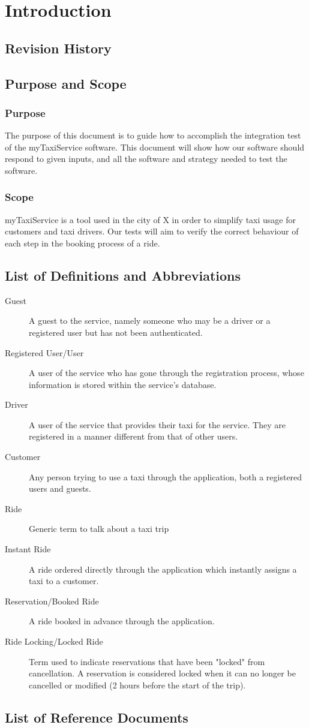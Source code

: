 \section{Introduction}
  \subsection{Revision History}
  \subsection{Purpose and Scope}
    \subsubsection{Purpose}
      The purpose of this document is to guide how to accomplish the integration test of the myTaxiService software.
      This document will show how our software should respond to given inputs, and all the software and strategy needed to test the software.
    \subsubsection{Scope}
      myTaxiService is a tool used in the city of X in order to simplify taxi usage for customers and taxi drivers. Our tests will aim to verify the correct behaviour of 
	  each step in the booking process of a ride.
  \subsection{List of Definitions and Abbreviations}
    \begin{description}
    	\item[Guest]
    		A guest to the service, namely someone who may be a driver or a registered user but has not been authenticated.
    	\item[Registered User/User]
    		A user of the service who has gone through the registration process, whose information is stored within the service's database.
    	\item[Driver]
    		A user of the service that provides their taxi for the service. They are registered in a manner different from that of other users.
    	\item[Customer]
    		Any person trying to use a taxi through the application, both a registered users and guests.
    	\item[Ride]
    		Generic term to talk about a taxi trip
    	\item[Instant Ride]
    		A ride ordered directly through the application which instantly assigns a taxi to a customer.
    	\item[Reservation/Booked Ride]
    		A ride booked in advance through the application.
    	\item[Ride Locking/Locked Ride]
    		Term used to indicate reservations that have been "locked" from cancellation. A reservation is considered locked when it can no
    		longer be cancelled or modified (2 hours before the start of the trip).
    \end{description}
  \subsection{List of Reference Documents}
